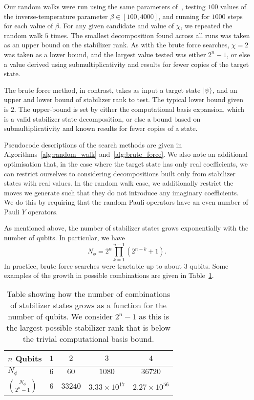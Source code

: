 Our random walks were run using the same parameters of~\cite{Bravyi2015}, testing $100$ values of the inverse-temperature parameter $\beta\in [100,4000]$, and running for $1000$ steps for each value of $\beta$. For any given candidate and value of $\chi$, we repeated the random walk $5$ times. The smallest decomposition found across all runs was taken as an upper bound on the stabilizer rank. As with the brute force searches, $\chi=2$ was taken as a lower bound, and the largest value tested was either $2^{n}-1$, or else a value derived using submultiplicativity and results for fewer copies of the target state.\par
The brute force method, in contrast, takes as input a target state $\ket{\psi}$, and an upper and lower bound of stabilizer rank to test. The typical lower bound given is $2$. The upper-bound is set by either the computational basis expansion, which is a valid stabilizer state decomposition, or else a bound based on submultiplicativity and known results for fewer copies of a state.\par
Pseudocode descriptions of the search methods are given in Algorithms~\ref{alg:random_walk} and~\ref{alg:brute_force}. We also note an additional optimisation that, in the case where the target state has only real coefficients, we can restrict ourselves to considering decompositions built only from stabilizer states with real values. In the random walk case, we additionally restrict the moves we generate such that they do not introduce any imaginary coefficients. We do this by requiring that the random Pauli operators have an even number of Pauli $Y$ operators.\par
As mentioned above, the number of stabilizer states grows exponentially with the number of qubits. In particular, we have~\cite{Aaronson2004}
\begin{equation}
N_{\phi} = 2^{n}\prod_{k=1}^{n-1}\left(2^{n-k}+1\right).
\end{equation}
In practice, brute force searches were tractable up to about $3$ qubits. Some examples of the growth in possible combinations are given in Table~\ref{tab:n_combinations}.\par
\begin{table}[H]
\centering
\begin{tabular}{| l | c | c | c | c |}
\hline
$n$ Qubits & $1$ & $2$ & $3$ & $4$ \\ \hline
$N_{\phi}$ & $6$ & $60$ & $1080$ & $36720$ \\ \hline
$\binom{N_{\phi}}{2^{n}-1}$ & $6$ & $33240$ & $3.33\times10^{17}$ & $2.27\times 10^{56}$ \\ \hline
\end{tabular}
\caption{Table showing how the number of combinations of stabilizer states grows as a function for the number of qubits. We consider $2^{n}-1$ as this is the largest possible stabilizer rank that is below the trivial computational basis bound.}
\label{tab:n_combinations}
\end{table}
